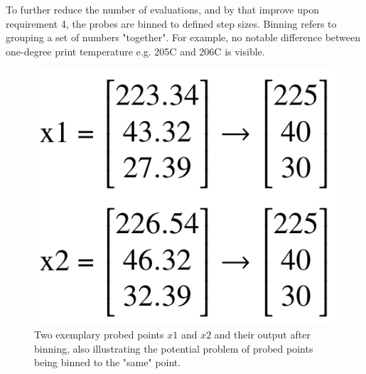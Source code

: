 To further reduce the number of evaluations, and by that improve upon requirement 4, the probes are binned to defined step sizes. Binning refers to grouping a set of numbers "together". For example, no notable difference between one-degree print temperature e.g. 205\textdegree C and 206\textdegree C is visible. \begin{figure}
    \centering
    \includegraphics[width=0.9\linewidth]{assets/casting_binning_matrices.png}
    \caption{Two exemplary probed points $x1$ and $x2$ and their output after binning, also illustrating the potential problem of probed points being binned to the "same" point.}
    \label{figure/casting_binning_matrices}

\end{figure}
